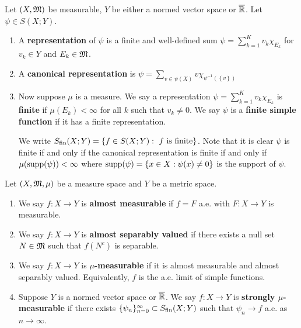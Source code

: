 \documentclass[a4paper]{article}
\begin{document}
\begin{defi}
  
Let $(X, \mathfrak{M})$ be measurable, $Y$ be either a normed vector
space or $\overline{\mathbb{R}}$. Let $\psi \in S(X; Y)$.
\begin{enumerate}
  \item A \textbf{representation} of $\psi$ is a finite and 
  well-defined sum 
  $\psi = \sum_{k=1}^K v_k \chi_{E_k}$ 
  for $v_k \in Y$ and $E_k \in \mathfrak{M}$.
  
  \item A \textbf{canonical representation} is 
  $\psi = \sum_{v \in \psi(X)} v \chi_{\psi^{-1}
  (\left\{ v \right\})}$
  \item Now suppose $\mu$ is a measure.
  We say a representation $\psi = \sum_{k=1}^K 
  v_k \chi_{E_k}$ is \textbf{finite} if $\mu(E_k) < \infty$
  for all $k$ such that $v_k \neq 0$. We 
  say $\psi$ is a \textbf{finite simple function} if it has a 
  finite representation.
  
  We write $S_{\text{fin}}(X; Y) = \left\{ 
    f \in S(X; Y) : \text{ $f$ is finite}
   \right\}$.
  Note that it is clear $\psi$ is finite if and only if 
  the canonical representation is finite if and only if 
  $\mu(\operatorname{supp}(\psi)) < \infty$ where 
  $\operatorname{supp}(\psi) = \left\{ x \in X : \psi(x) \neq 0 \right\}$
  is the support of $\psi$.
\end{enumerate}

\end{defi}

\begin{defi}
  Let $(X, \mathfrak{M}, \mu)$ be a measure space and $Y$ be a metric 
  space. 
  \begin{enumerate}
    \item We say $f : X \to Y$ is \textbf{almost measurable} 
    if $f = F$ a.e. with $F: X \to Y$ is measurable.
    
    \item We say $f : X \to Y$ is \textbf{almost separably valued}
    if there exists a null set $N \in \mathfrak{M}$ such that 
    $f(N^c)$ is separable.
    
    \item We say $f: X \to Y$ is \textbf{$\mu$-measurable} if 
    it is almost measurable and almost separably valued.
    Equivalently, $f$ is the a.e. limit of simple functions.

    \item Suppose $Y$ is a normed vector space or $\overline{\mathbb{R}}$.
    We say $f: X \to Y$ is \textbf{strongly $\mu$-measurable} 
    if there exists $\{ \psi_n \}_{n=0}^\infty \subset S_{\text{fin}}(X; Y)$
    such that $\psi_n \to f$ a.e. as $n \to \infty$.
  \end{enumerate}
\end{defi}
\end{document}
